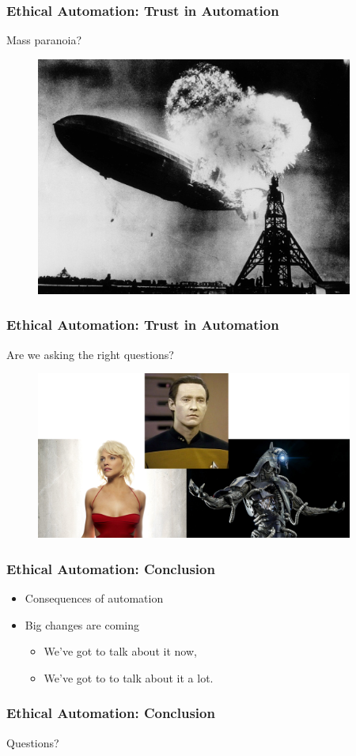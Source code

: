 \begin{frame}
	\frametitle{ Ethical Automation: Trust in Automation}
	{\Large Mass paranoia?}
	\begin{figure}[bht]
		\centering
		\includegraphics[width=4.1in]{diagrams/Hindenburg}
		\caption{}
		\label{fig:-deg}
	\end{figure}
\end{frame}

\begin{frame}
	\frametitle{ Ethical Automation: Trust in Automation}
	{\Large Are we asking the right questions?}
	\begin{figure}[bht]
		\centering
		\includegraphics[width=4.1in]{diagrams/AIs}
		\caption{}
		\label{fig:-deg}
	\end{figure}
\end{frame}

\begin{frame}
	\frametitle{ Ethical Automation: Conclusion}
	\begin{itemize}
		\item Consequences of automation
		\item Big changes are coming
		\begin{itemize}
			\item We've got to talk about it now,
			\item We've got to to talk about it a lot.
		\end{itemize}
	\end{itemize}
\end{frame}


\begin{frame}
	\frametitle{ Ethical Automation: Conclusion}
	\Large Questions?
\end{frame}

